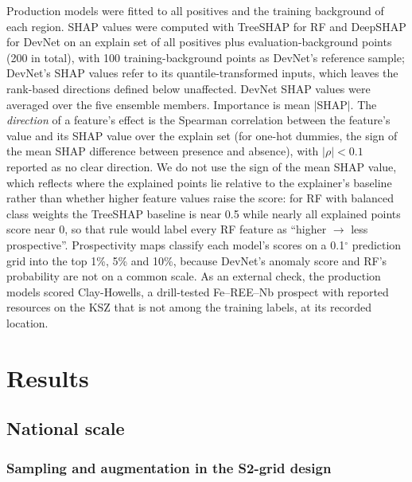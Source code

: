 \documentclass[pdflatex,sn-apa]{sn-jnl}
\begin{document}
Production models were fitted to all positives and the training background of each region. SHAP values \citep{Lundberg2017} were computed with TreeSHAP for RF \citep{Lundberg2020} and DeepSHAP for DevNet on an explain set of all positives plus evaluation-background points (200 in total), with 100 training-background points as DevNet's reference sample; DevNet's SHAP values refer to its quantile-transformed inputs, which leaves the rank-based directions defined below unaffected. DevNet SHAP values were averaged over the five ensemble members. Importance is mean $|$SHAP$|$. The \emph{direction} of a feature's effect is the Spearman correlation between the feature's value and its SHAP value over the explain set (for one-hot dummies, the sign of the mean SHAP difference between presence and absence), with $|\rho| < 0.1$ reported as no clear direction. We do not use the sign of the mean SHAP value, which reflects where the explained points lie relative to the explainer's baseline rather than whether higher feature values raise the score: for RF with balanced class weights the TreeSHAP baseline is near 0.5 while nearly all explained points score near 0, so that rule would label every RF feature as ``higher $\rightarrow$ less prospective''. Prospectivity maps classify each model's scores on a 0.1$^\circ$ prediction grid into the top 1\%, 5\% and 10\%, because DevNet's anomaly score and RF's probability are not on a common scale. As an external check, the production models scored Clay-Howells, a drill-tested Fe--REE--Nb prospect with reported resources on the KSZ \citep{OGS2011} that is not among the training labels, at its recorded location.

\section{Results}\label{sec:results}

\subsection{National scale}\label{sec:res-national}

\subsubsection{Sampling and augmentation in the S2-grid design}\label{sec:res-ladder}
\end{document}
